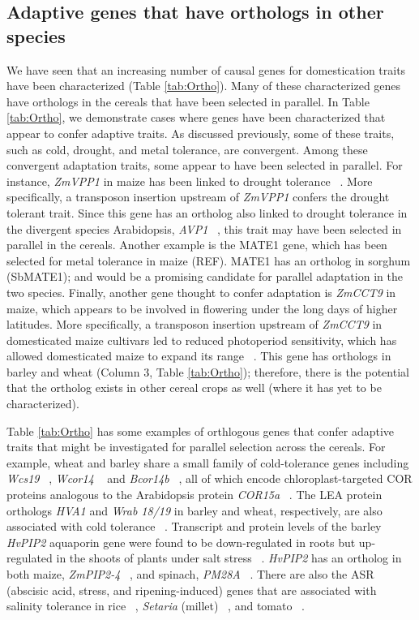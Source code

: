\documentclass[12pt]{article}
\begin{document}
\subsection*{Adaptive genes that have orthologs in other species}
We have seen that an increasing number of causal genes for domestication traits have been characterized (Table \ref{tab:Ortho}). 
Many of these characterized genes have orthologs in the cereals that have been selected in parallel.   
In Table \ref{tab:Ortho}, we demonstrate cases where genes have been characterized that appear to confer adaptive traits. 
As discussed previously, some of these traits, such as cold, drought, and metal tolerance, are convergent. Among these convergent adaptation traits, some appear to have been selected in parallel. 
For instance, \textit{ZmVPP1} in maize has been linked to drought tolerance ~\citep{Wang2016}. More specifically, a transposon insertion upstream of \textit{ZmVPP1} confers the drought tolerant trait. 
Since this gene has an ortholog also linked to drought tolerance in the divergent species Arabidopsis, \textit{AVP1} ~\citep{Gaxiola2001}, this trait may have been selected in parallel in the cereals. 
Another example is the MATE1 gene, which has been selected for metal tolerance in maize (REF). MATE1 has an ortholog in sorghum (SbMATE1); and would be a promising candidate for parallel adaptation in the two species. 
Finally, another gene thought to confer adaptation is \textit{ZmCCT9} in maize, which appears to be involved in flowering under the long days of higher latitudes.
More specifically, a transposon insertion upstream of \textit{ZmCCT9} in domesticated maize cultivars led to reduced photoperiod sensitivity, which has allowed domesticated maize to expand its range ~\citep{Huang2017}. 
This gene has orthologs in barley and wheat (Column 3, Table \ref{tab:Ortho}); therefore, there is the potential that the ortholog exists in other cereal crops as well (where it has yet to be characterized).

Table \ref{tab:Ortho} has some examples of orthlogous genes that confer adaptive traits that might be investigated for parallel selection across the cereals. For example, wheat and barley share a small family of cold-tolerance genes including \textit{Wcs19} ~\citep{pmid8219063}, \textit{Wcor14} ~\citep{pmid10846621} and \textit{Bcor14b} ~\citep{pmid9952464}, all of which encode chloroplast-targeted COR proteins analogous to the Arabidopsis protein \textit{COR15a}  ~\citep{pmid9826741, Takumi2003}.
The LEA protein orthologs \textit{HVA1} and \textit{Wrab 18/19} in barley and wheat, respectively, are also associated with cold tolerance ~\citep{Hong1988, pmid16755132}.
Transcript and protein levels of the barley \textit{HvPIP2} aquaporin gene were found to be down-regulated in roots but up-regulated in the shoots of plants under salt stress ~\citep{Katsuhara2002}.
\textit{HvPIP2} has an ortholog in both maize, \textit{ZmPIP2-4} ~\citep{Zhu2005}, and spinach, \textit{PM28A} ~\citep{Fotiadis2000}.
There are also the ASR (abscisic acid, stress, and ripening-induced) genes that are associated with salinity tolerance in rice ~\citep{Joo2013}, \textit{Setaria} (millet) ~\citep{Li2017}, and tomato ~\citep{Konrad2008}.  
\end{document}
